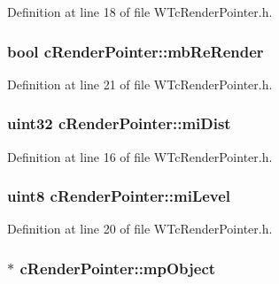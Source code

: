 Definition at line 18 of file WTcRenderPointer.h.

\hypertarget{classc_render_pointer_a7ef8dbb11d8bc69a9549db62a45679a7}{
\subsubsection[{mbReRender}]{\setlength{\rightskip}{0pt plus 5cm}bool {\bf cRenderPointer::mbReRender}}}
\label{classc_render_pointer_a7ef8dbb11d8bc69a9549db62a45679a7}


Definition at line 21 of file WTcRenderPointer.h.

\hypertarget{classc_render_pointer_a0a87e7addf0caeb10eb7aee109ac958a}{
\subsubsection[{miDist}]{\setlength{\rightskip}{0pt plus 5cm}uint32 {\bf cRenderPointer::miDist}}}
\label{classc_render_pointer_a0a87e7addf0caeb10eb7aee109ac958a}


Definition at line 16 of file WTcRenderPointer.h.

\hypertarget{classc_render_pointer_a12ff5d23eb2efcaf720daa33f39c4938}{
\subsubsection[{miLevel}]{\setlength{\rightskip}{0pt plus 5cm}uint8 {\bf cRenderPointer::miLevel}}}
\label{classc_render_pointer_a12ff5d23eb2efcaf720daa33f39c4938}


Definition at line 20 of file WTcRenderPointer.h.

\hypertarget{classc_render_pointer_a3a931cfd60605a842ebf9d1b591adba8}{
\subsubsection[{mpObject}]{$\ast$ {\bf cRenderPointer::mpObject}}}
\label{classc_render_pointer_a3a931cfd60605a842ebf9d1b591adba8}


